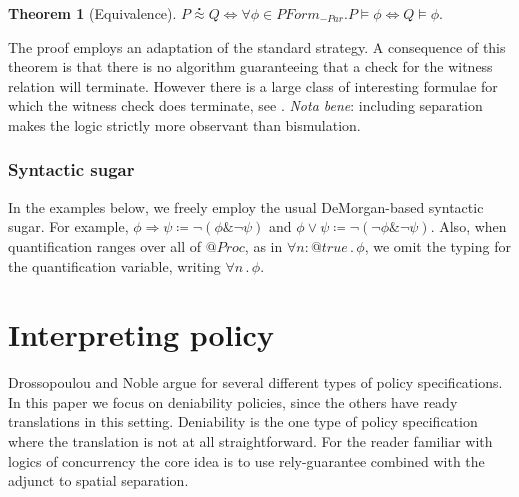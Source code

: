 \documentclass[]{acm_proc_article-sp}
\makeatletter
\newcommand{\quotep}[1]{@#1}
\newcommand{\QProc}{\quotep{\mathbin{Proc}}}
\newcommand{\defneqls}{\coloneqq}
\newcommand{\wbbisim}{\stackrel{\centerdot}{\approx}} %
\newcommand{\ptrue}{\mathbin{true}}
\newcommand{\pquant}[3]{\forall #1 \mathbin{:} #2 \mathbin{.} #3}
\newcommand{\pquantuntyped}[2]{\forall #1 \mathbin{.} #2}
\newcommand{\riff}{\Leftrightarrow}
\newcommand{\PFormula}{\mathbin{PForm}}
\newtheorem{thm}{Theorem}[subsection]
\numberwithin{equation}{subsection}
\makeatother
\begin{document}
\begin{thm}[Equivalence]\label{sec:equivalence_theorem}
	$P \wbbisim Q \riff \forall \phi \in \PFormula_{-Par} . P \models \phi \riff Q \models \phi .$
\end{thm}

The proof employs an adaptation of the standard strategy. A
consequence of this theorem is that there is no algorithm guaranteeing
that a check for the witness relation will terminate. However there is
a large class of interesting formulae for which the witness check does
terminate, see \cite{DBLP:conf/fossacs/Caires04}. {\em Nota bene}: including
separation makes the logic strictly more observant than bismulation.

\subsubsection{Syntactic sugar }

In the examples below, we freely employ the usual DeMorgan-based
syntactic sugar. For example, $\phi \Rightarrow \psi \defneqls \neg (
\phi \& \neg \psi )$ and $\phi \vee \psi \defneqls \neg ( \neg \phi \&
\neg \psi )$. Also, when quantification ranges over all of $\QProc$,
as in $\pquant{n}{\quotep{\ptrue}}{\phi}$, we omit the typing for the
quantification variable, writing $\pquantuntyped{n}{\phi}$.

\section{Interpreting policy}

Drossopoulou and Noble \cite{Drossopoulou:2013:NCP:2489804.2489811} argue for
several different types of policy specifications. In this paper we
focus on deniability policies, since the others have ready
translations in this setting. Deniability is the one type of policy
specification where the translation is not at all straightforward. For
the reader familiar with logics of concurrency the core idea is to use
rely-guarantee combined with the adjunct to spatial separation.
\end{document}
